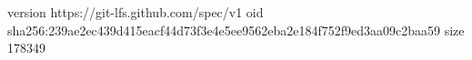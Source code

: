 version https://git-lfs.github.com/spec/v1
oid sha256:239ae2ec439d415eacf44d73f3e4e5ee9562eba2e184f752f9ed3aa09c2baa59
size 178349
